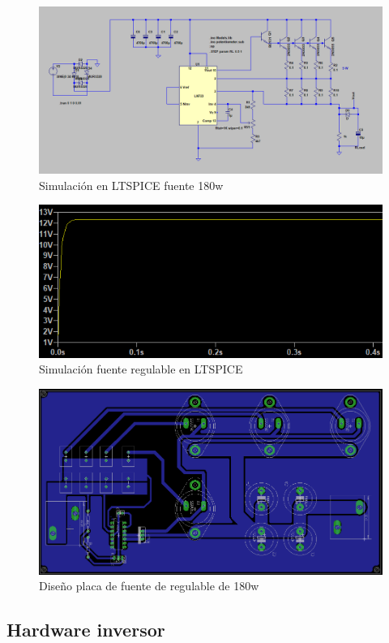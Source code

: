 \begin{figure}[H]
\centering
\includegraphics[width=12cm]{Capitulo3/figs/SIMFUENTE.png}
\caption{Simulación en LTSPICE fuente 180w}
\end{figure}




\begin{figure}[H]
\centering
\includegraphics[width=12cm]{Capitulo3/figs/12v.png}
\caption{Simulación fuente regulable en LTSPICE}
\end{figure}

\begin{figure}[H]
\centering
\includegraphics[width=12cm]{Capitulo3/figs/pcb.png}
\caption{Diseño placa de fuente de regulable de 180w}
\end{figure}

\subsection{Hardware inversor}

